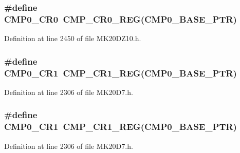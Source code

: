\subsubsection[{\texorpdfstring{C\+M\+P0\+\_\+\+C\+R0}{CMP0_CR0}}]{\setlength{\rightskip}{0pt plus 5cm}\#define C\+M\+P0\+\_\+\+C\+R0~{\bf C\+M\+P\+\_\+\+C\+R0\+\_\+\+R\+EG}({\bf C\+M\+P0\+\_\+\+B\+A\+S\+E\+\_\+\+P\+TR})}\hypertarget{group___c_m_p___register___accessor___macros_ga0b4ea995265b027fb308b236b2f0afd4}{}\label{group___c_m_p___register___accessor___macros_ga0b4ea995265b027fb308b236b2f0afd4}


Definition at line 2450 of file M\+K20\+D\+Z10.\+h.

\subsubsection[{\texorpdfstring{C\+M\+P0\+\_\+\+C\+R1}{CMP0_CR1}}]{\setlength{\rightskip}{0pt plus 5cm}\#define C\+M\+P0\+\_\+\+C\+R1~{\bf C\+M\+P\+\_\+\+C\+R1\+\_\+\+R\+EG}({\bf C\+M\+P0\+\_\+\+B\+A\+S\+E\+\_\+\+P\+TR})}\hypertarget{group___c_m_p___register___accessor___macros_ga993cebfc8cb6bcf6caec49cd75218d17}{}\label{group___c_m_p___register___accessor___macros_ga993cebfc8cb6bcf6caec49cd75218d17}


Definition at line 2306 of file M\+K20\+D7.\+h.

\subsubsection[{\texorpdfstring{C\+M\+P0\+\_\+\+C\+R1}{CMP0_CR1}}]{\setlength{\rightskip}{0pt plus 5cm}\#define C\+M\+P0\+\_\+\+C\+R1~{\bf C\+M\+P\+\_\+\+C\+R1\+\_\+\+R\+EG}({\bf C\+M\+P0\+\_\+\+B\+A\+S\+E\+\_\+\+P\+TR})}\hypertarget{group___c_m_p___register___accessor___macros_ga993cebfc8cb6bcf6caec49cd75218d17}{}\label{group___c_m_p___register___accessor___macros_ga993cebfc8cb6bcf6caec49cd75218d17}


Definition at line 2306 of file M\+K20\+D7.\+h.

